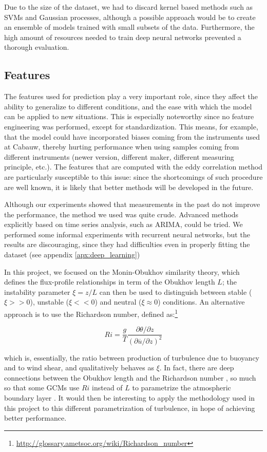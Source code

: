 \documentclass[a4paper,11pt]{kth-mag}
\begin{document}
Due to the size of the dataset, we had to discard kernel based methods such as SVMs and Gaussian processes, although a possible approach would be to create an ensemble of models trained with small subsets of the data. Furthermore, the high amount of resources needed to train deep neural networks prevented a thorough evaluation.

\subsection{Features}
The features used for prediction play a very important role, since they affect the ability to generalize to different conditions, and the ease with which the model can be applied to new situations. This is especially noteworthy since no feature engineering was performed, except for standardization. This means, for example, that the model could have incorporated biases coming from the instruments used at Cabauw, thereby hurting performance when using samples coming from different instruments (newer version, different maker, different measuring principle, etc.). The features that are computed with the eddy correlation method are particularly susceptible to this issue: since the shortcomings of such procedure are well known, it is likely that better methods will be developed in the future.

Although our experiments showed that measurements in the past do not improve the performance, the method we used was quite crude. Advanced methods explicitly based on time series analysis, such as ARIMA, could be tried. We performed some informal experiments with recurrent neural networks, but the results are discouraging, since they had difficulties even in properly fitting the dataset (see appendix \ref{apx:deep_learning})

In this project, we focused on the Monin-Obukhov similarity theory, which defines the flux-profile relationships in term of the Obukhov length $L$; the instability parameter $\xi=z/L$ can then be used to distinguish between stable ($\xi>>0$), unstable ($\xi<<0$) and neutral ($\xi\approx0$) conditions. An alternative approach is to use the Richardson number, defined as:\footnote{\url{http://glossary.ametsoc.org/wiki/Richardson_number}}

\begin{equation}
Ri=\frac{g}{T}\frac{\partial\theta/\partial z}{(\partial\overline{u}/\partial z)^2}
\end{equation}

\noindent which is, essentially, the ratio between production of turbulence due to buoyancy and to wind shear, and qualitatively behaves as $\xi$. In fact, there are deep connections between the Obukhov length and the Richardson number \citep{mostayyyy}, so much so that some GCMs use $Ri$ instead of $L$ to parametrize the atmospheric boundary layer \citep{gfdl_am2,gfdl_am3}. It would then be interesting to apply the methodology used in this project to this different parametrization of turbulence, in hope of achieving better performance.
\end{document}
